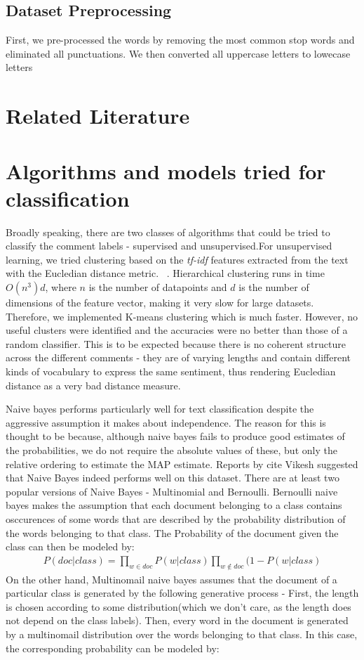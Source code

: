 \documentclass{sig-alternate-05-2015}
\begin{document}
\subsection{Dataset Preprocessing}
 First, we pre-processed the words by removing the most common stop words and eliminated all punctuations. We then converted all uppercase letters to lowecase letters
\section{Related Literature}

\section{Algorithms and models tried for classification}
Broadly speaking, there are two classes of algorithms that could be tried to classify the comment labels - supervised and unsupervised.For unsupervised learning, we tried clustering based on the \textit{tf-idf} features extracted from the text with the Eucledian distance metric. \
. Hierarchical clustering runs in time $O (n^3)d$, where $n$ is the number of datapoints and $d$ is the number of dimensions of the feature vector, making it very slow for large datasets. Therefore,  we implemented K-means clustering which is much faster. However, no useful clusters were identified and the accuracies were no better than those of a random classifier. This is to be expected because there is no coherent structure across the different comments - they are of varying lengths and contain different kinds of vocabulary to express the same sentiment, thus rendering Eucledian distance as a very bad distance measure.

Naive bayes performs particularly well for text classification despite the aggressive assumption it makes about independence.  The reason for this is thought to be because, although naive bayes fails to produce good estimates of the probabilities, we do not require the absolute values of these, but only the relative ordering to estimate the MAP estimate. Reports by cite Vikesh suggested that Naive Bayes indeed performs well on this dataset. There are at least two popular versions of Naive Bayes - Multinomial and Bernoulli. 
Bernoulli naive bayes makes the assumption that each document belonging to a class contains osccurences of some words that are described by the probability distribution of the words belonging to that class. The  Probability of the document given the class can then be modeled by:
\begin{align*}
P(doc|class) = \prod_{w \in doc}P(w|class) \prod_{w\not\in doc}(1-P(w|class)
\end{align*}
On the other hand, Multinomail naive bayes assumes that the document of a particular class is generated by the following generative process - First, the length is chosen according to some distribution(which we don't care, as the length does not depend on the class labels). Then, every word in the document is generated by a multinomail distribution over the words belonging to that class. In this case, the corresponding probability can be modeled by:
\end{document}
